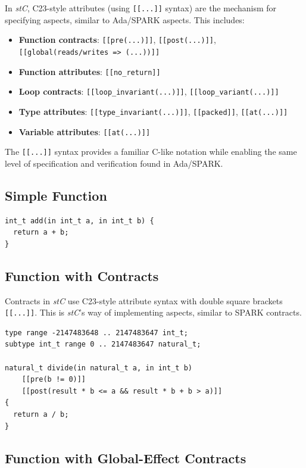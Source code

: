 \documentclass[11pt,letterpaper,twoside,openany]{book}
\begin{document}
In \emph{stC}, C23-style attributes (using \verb'[[...]]' syntax) are the mechanism for specifying aspects, similar to Ada/SPARK aspects. This includes:
\begin{itemize}
\item \textbf{Function contracts}: \verb'[[pre(...)]]', \verb'[[post(...)]]', \verb'[[global(reads/writes => (...))]]'
\item \textbf{Function attributes}: \verb'[[no_return]]'
\item \textbf{Loop contracts}: \verb'[[loop_invariant(...)]]', \verb'[[loop_variant(...)]]'
\item \textbf{Type attributes}: \verb'[[type_invariant(...)]]', \verb'[[packed]]', \verb'[[at(...)]]'
\item \textbf{Variable attributes}: \verb'[[at(...)]]'
\end{itemize}

The \verb'[[...]]' syntax provides a familiar C-like notation while enabling the same level of specification and verification found in Ada/SPARK.

\subsection{Simple Function}
\begin{lstlisting}
int_t add(in int_t a, in int_t b) {
  return a + b;
}
\end{lstlisting}

\subsection{Function with Contracts}

Contracts in \emph{stC} use C23-style attribute syntax with double square brackets \verb'[[...]]'. This is \emph{stC}'s way of implementing aspects, similar to SPARK contracts.

\begin{lstlisting}
type range -2147483648 .. 2147483647 int_t;
subtype int_t range 0 .. 2147483647 natural_t;

natural_t divide(in natural_t a, in int_t b)
    [[pre(b != 0)]]
    [[post(result * b <= a && result * b + b > a)]]
{
  return a / b;
}
\end{lstlisting}

\subsection{Function with Global-Effect Contracts}
\end{document}
